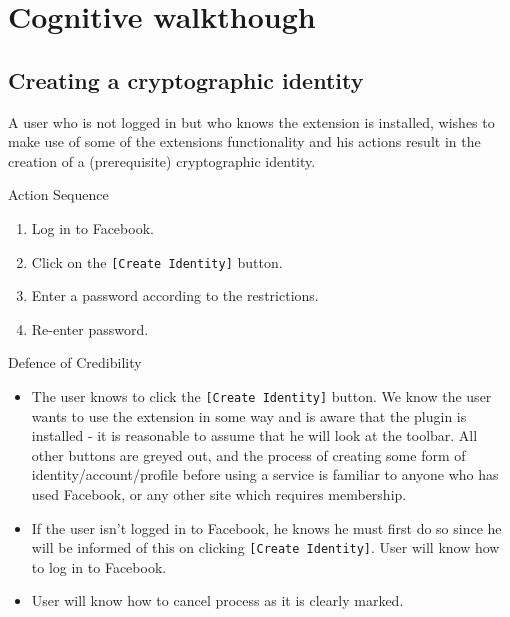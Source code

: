 \chapter{Cognitive walkthough}
\label{app:cw}

\section{Creating a cryptographic identity}
\label{app:cw:create}
A user who is not logged in but who knows the extension is installed, wishes to make use of some of the extensions functionality and his actions result in the creation of a (prerequisite) cryptographic identity.

\begin{desc}

    \item[Action Sequence] \hfill
    
    \begin{enumerate}
        \item Log in to Facebook.
        \item Click on the {\tt [Create Identity]} button.
        \item Enter a password according to the restrictions.
        \item Re-enter password.
    \end{enumerate}
    
    \item[Defence of Credibility] \hfill
        \begin{itemize}
            
            \item The user knows to click the {\tt [Create Identity]} button. We know the user wants to use the extension in some way and is aware that the plugin is installed - it is reasonable to assume that he will look at the toolbar. All other buttons are greyed out, and the process of creating some form of identity/account/profile before using a service is familiar to anyone who has used Facebook, or any other site which requires membership.
            
            \item If the user isn't logged in to Facebook, he knows he must first do so since he will be informed of this on clicking {\tt [Create Identity]}. User will know how to log in to Facebook.
            
            \item User will know how to cancel process as it is clearly marked.
            

\end{itemize}
\end{desc}

